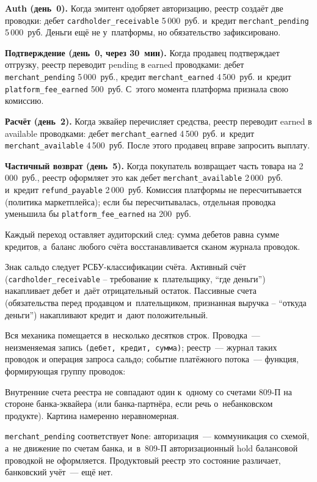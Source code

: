 \textbf{Auth (день~0).} Когда эмитент одобряет авторизацию, реестр
создаёт две проводки: дебет \texttt{cardholder\_receivable}
5\,000~руб. и~кредит \texttt{merchant\_pending} 5\,000~руб. Деньги
ещё не у~платформы, но обязательство зафиксировано.

\textbf{Подтверждение (день~0, через 30~мин).} Когда продавец
подтверждает отгрузку, реестр переводит pending в earned проводками:
дебет \texttt{merchant\_pending} 5\,000~руб., кредит
\texttt{merchant\_earned} 4\,500~руб. и~кредит
\texttt{platform\_fee\_earned} 500~руб. С~этого момента платформа
признала свою комиссию.

\textbf{Расчёт (день~2).} Когда эквайер перечисляет средства,
реестр переводит earned в available проводками: дебет
\texttt{merchant\_earned} 4\,500~руб. и~кредит
\texttt{merchant\_available} 4\,500~руб. После этого продавец
вправе запросить выплату.

\textbf{Частичный возврат (день~5).} Когда покупатель возвращает
часть товара на 2\,000~руб., реестр оформляет это как дебет
\texttt{merchant\_available} 2\,000~руб. и~кредит
\texttt{refund\_payable} 2\,000~руб. Комиссия платформы
не пересчитывается (политика маркетплейса); если бы пересчитывалась,
отдельная проводка уменьшила бы \texttt{platform\_fee\_earned}
на 200~руб.

Каждый переход оставляет аудиторский след: сумма дебетов
равна сумме кредитов, а~баланс любого счёта восстанавливается
сканом журнала проводок.

Знак сальдо следует РСБУ-классификации счёта. Активный счёт
(\texttt{cardholder\_receivable} -- требование к~плательщику,
\enquote{где деньги}) накапливает дебет и~даёт отрицательный
остаток. Пассивные счета (обязательства перед продавцом и~плательщиком,
признанная выручка -- \enquote{откуда деньги}) накапливают
кредит и~дают положительный.

Вся механика помещается в~несколько десятков строк. Проводка~---
неизменяемая запись \texttt{(дебет, кредит, сумма)}; реестр~---
журнал таких проводок и операция запроса сальдо; событие платёжного
потока~--- функция, формирующая группу проводок:


Внутренние счета реестра не совпадают один к~одному со счетами 809-П
на стороне банка-эквайера (или банка-партнёра, если речь
о~небанковском продукте). Картина намеренно неравномерная.

\texttt{merchant\_pending} соответствует \texttt{None}: авторизация~---
коммуникация со схемой, а~не движение по счетам банка, и~в~809-П
авторизационный hold балансовой проводкой не оформляется. Продуктовый
реестр это состояние различает, банковский учёт~--- ещё нет.

